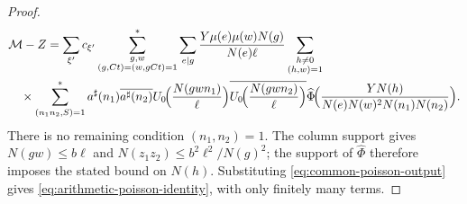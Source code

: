 \documentclass[11pt,a4paper]{article}
\numberwithin{equation}{section}
\numberwithin{figure}{section}
\theoremstyle{definition}
\theoremstyle{remark}
\begin{document}
\begin{proof}
\[
 \begin{aligned}
 &\mathcal M-Z=\sum_{\xi'}c_{\xi'}
 \sum_{\substack{g,w\\(g,Ct)=(w,gCt)=1}}^*
 \sum_{e\mid g}\frac{Y\mu(e)\mu(w)N(g)}{N(e)\ell}
 \sum_{\substack{h\ne0\\(h,w)=1}}\\
 &\quad\times\sum_{(n_1n_2,S)=1}^*a^\sharp(n_1)\overline{a^\sharp(n_2)}
 U_0\!\Bigl(\frac{N(gwn_1)}\ell\Bigr)
 \overline{U_0\!\Bigl(\frac{N(gwn_2)}\ell\Bigr)} \widehat\Phi\!\Bigl(
   \frac{YN(h)}{N(e)N(w)^2N(n_1)N(n_2)}\Bigr).
 \end{aligned}
\]
There is no remaining condition $(n_1,n_2)=1$. The column support gives
$N(gw)\le b\ell$ and $N(z_1z_2)\le b^2\ell^2/N(g)^2$;
the support of $\widehat\Phi$ therefore imposes the stated bound on
$N(h)$. Substituting \eqref{eq:common-poisson-output} gives
\eqref{eq:arithmetic-poisson-identity}, with only finitely many terms.
\end{proof}
\end{document}
